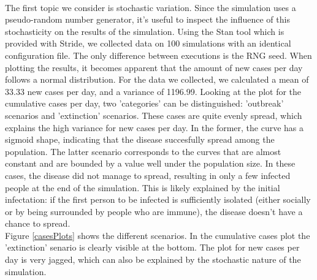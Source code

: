 \documentclass[runningheads]{llncs}
\begin{document}
\paragraph{} The first topic we consider is stochastic variation. Since the simulation uses a pseudo-random number generator, it's useful to inspect the influence of this stochasticity on the results of the simulation. Using the Stan tool which is provided with Stride, we collected data on 100 simulations with an identical configuration file. The only difference between executions is the RNG seed. When plotting the results, it becomes apparent that the amount of new cases per day follows a normal distribution. For the data we collected, we calculated a  mean of 33.33 new cases per day, and a variance of 1196.99. Looking at the plot for the cumulative cases per day, two 'categories' can be distinguished:  'outbreak' scenarios and 'extinction' scenarios. These cases are quite evenly spread, which explains the high variance for new cases per day. In the former, the curve has a sigmoid shape, indicating that the disease succesfully spread among the population. The latter scenario corresponds to the curves that are almost constant and are bounded by a value well under the population size. In these cases, the disease did not manage to spread, resulting in only a few infected people at the end of the simulation. This is likely explained by the initial infectation: if the first person to be infected is sufficiently isolated (either socially or by being surrounded by people who are immune), the disease doesn't have a chance to spread.\\
Figure \ref{casesPlots} shows the different scenarios. In the cumulative cases plot the 'extinction' senario is clearly visible at the bottom. The plot for new cases per day is very jagged, which can also be explained by the stochastic nature of the simulation.
\end{document}
